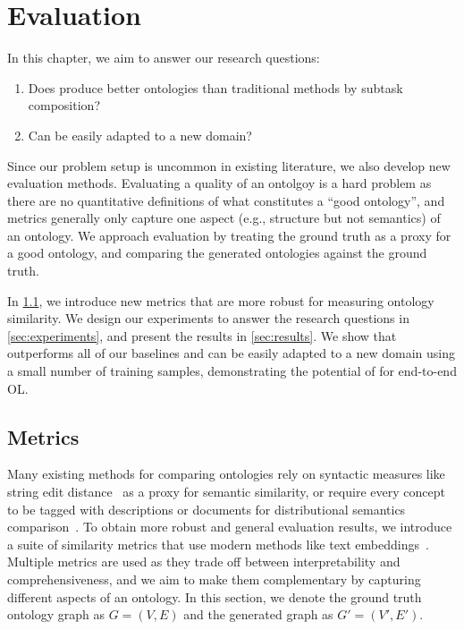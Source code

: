 \chapter{Evaluation}

In this chapter, we aim to answer our research questions:
\begin{enumerate}[leftmargin=*]
    \item Does \name produce better ontologies than traditional methods by subtask composition?
    \item Can \name be easily adapted to a new domain?
\end{enumerate}
Since our problem setup is uncommon in existing literature, we also develop new evaluation methods. Evaluating a quality of an ontolgoy is a hard problem as there are no quantitative definitions of what constitutes a ``good ontology'', and metrics generally only capture one aspect (e.g., structure but not semantics) of an ontology. We approach evaluation by treating the ground truth as a proxy for a good ontology, and comparing the generated ontologies against the ground truth.

In \cref{sec:metrics}, we introduce new metrics that are more robust for measuring ontology similarity. We design our experiments to answer the research questions in \cref{sec:experiments}, and present the results in \cref{sec:results}. We show that \name outperforms all of our baselines and can be easily adapted to a new domain using a small number of training samples, demonstrating the potential of \name for end-to-end OL.

\section{Metrics}  \label{sec:metrics}

Many existing methods for comparing ontologies rely on syntactic measures like string edit distance~\cite{Ehrig2005SimilarityFO} as a proxy for semantic similarity, or require every concept to be tagged with descriptions or documents for distributional semantics comparison~\cite{Zavitsanos2011GoldSE}. To obtain more robust and general evaluation results, we introduce a suite of similarity metrics that use modern methods like text embeddings~\cite{reimers-2019-sentence-bert}. Multiple metrics are used as they trade off between interpretability and comprehensiveness, and we aim to make them complementary by capturing different aspects of an ontology. In this section, we denote the ground truth ontology graph as $G = (V, E)$ and the generated graph as $G' = (V', E')$.


